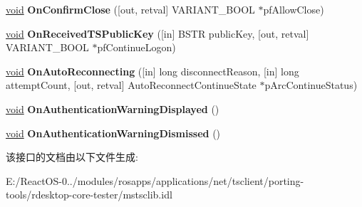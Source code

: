 \begin{DoxyCompactItemize}
\item 
\mbox{\label{interface_m_s_t_s_c_lib_1_1_i_ms_tsc_ax_events_a3574c12b55be2a76f0df93fa58678052}} 
\hyperlink{interfacevoid}{void} {\bfseries On\+Confirm\+Close} (\mbox{[}out, retval\mbox{]} V\+A\+R\+I\+A\+N\+T\+\_\+\+B\+O\+OL $\ast$pf\+Allow\+Close)
\item 
\mbox{\label{interface_m_s_t_s_c_lib_1_1_i_ms_tsc_ax_events_a633f0d507663ba39d837e57f5c6c2575}} 
\hyperlink{interfacevoid}{void} {\bfseries On\+Received\+T\+S\+Public\+Key} (\mbox{[}in\mbox{]} B\+S\+TR public\+Key, \mbox{[}out, retval\mbox{]} V\+A\+R\+I\+A\+N\+T\+\_\+\+B\+O\+OL $\ast$pf\+Continue\+Logon)
\item 
\mbox{\label{interface_m_s_t_s_c_lib_1_1_i_ms_tsc_ax_events_ad7acce62854bd05bb15089fe91b723c8}} 
\hyperlink{interfacevoid}{void} {\bfseries On\+Auto\+Reconnecting} (\mbox{[}in\mbox{]} long disconnect\+Reason, \mbox{[}in\mbox{]} long attempt\+Count, \mbox{[}out, retval\mbox{]} Auto\+Reconnect\+Continue\+State $\ast$p\+Arc\+Continue\+Status)
\item 
\mbox{\label{interface_m_s_t_s_c_lib_1_1_i_ms_tsc_ax_events_adb8c9ee546fedb443788a4ad79305319}} 
\hyperlink{interfacevoid}{void} {\bfseries On\+Authentication\+Warning\+Displayed} ()
\item 
\mbox{\label{interface_m_s_t_s_c_lib_1_1_i_ms_tsc_ax_events_a9c0797444602dfd6767cd282a7a2daa3}} 
\hyperlink{interfacevoid}{void} {\bfseries On\+Authentication\+Warning\+Dismissed} ()
\end{DoxyCompactItemize}


该接口的文档由以下文件生成\+:\begin{DoxyCompactItemize}
\item 
E\+:/\+React\+O\+S-\/0../modules/rosapps/applications/net/tsclient/porting-\/tools/rdesktop-\/core-\/tester/mstsclib.\+idl\end{DoxyCompactItemize}
